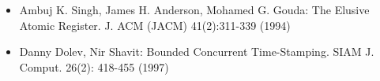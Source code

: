 

\begin{itemize}
\item Ambuj K. Singh, James H. Anderson, Mohamed G. Gouda: The Elusive Atomic Register. J. ACM (JACM) 41(2):311-339 (1994)
\item Danny Dolev, Nir Shavit: Bounded Concurrent Time-Stamping. SIAM J. Comput. 26(2): 418-455 (1997)
\end{itemize}
